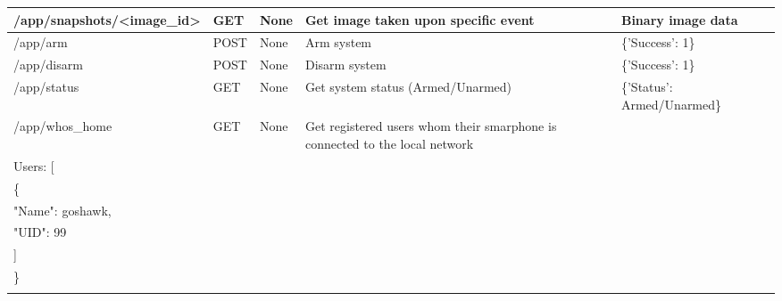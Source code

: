 \documentclass[10pt]{article}
\begin{document}
\begin{table}[ht]
{\begin{tabular}{| l | l | l | p{3cm} | p{6.5cm} | l |}
	/app/snapshots/<image\_id> & GET & None & Get image taken upon specific event & Binary image data & \\ \hline
	/app/arm & POST & None & Arm system & \{'Success': 1\} & \\ \hline
	/app/disarm & POST & None & Disarm system & \{'Success': 1\} & \\ \hline
	/app/status & GET & None & Get system status (Armed/Unarmed) & \{'Status': Armed/Unarmed\} & \\ \hline
	/app/whos\_home & GET & None & Get registered users whom their smarphone is connected to the local network & \pbox{25cm}{\{ \\ 
             	\quad Users: [ \\ 
             		\qquad \{ \\ 
             			\qquad \quad "Name": goshawk, \\
             			\qquad \quad "UID": 99 \\
             	\qquad ] \\ 
             \quad \} \\
           } & \\ \hline
\end{tabular}}
\end{table}
\end{document}
